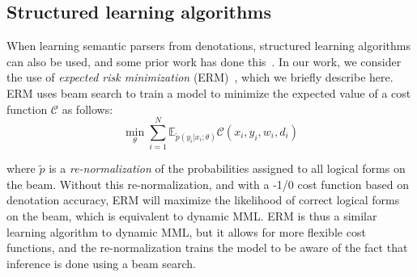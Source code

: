 \subsection{Structured learning algorithms} \label{sec:erm}

When learning semantic parsers from denotations, structured learning algorithms can also be used, and some prior work has done this~\cite{IyyerSQA2016,guu2017bridging}.  In our work, we consider the use of \emph{expected risk minimization} (ERM)~\cite{smith2006minimum}, which we briefly describe here.  ERM uses beam search to train a model to minimize the expected value of a cost function $\mathcal{C}$ as follows:
\begin{equation}
    \min_{\theta} \sum_{i=1}^{N} \mathbb{E}_{\tilde{p}(y_i|x_i; \theta)}\mathcal{C}(x_i, y_i, w_i, d_i)
    \label{eq:erm}
\end{equation}

\noindent
where $\tilde{p}$ is a \emph{re-normalization} of the probabilities assigned to all logical forms on the beam.  Without this re-normalization, and with a -1/0 cost function based on denotation accuracy, ERM will maximize the likelihood of correct logical forms on the beam, which is equivalent to dynamic MML.  ERM is thus a similar learning algorithm to dynamic MML, but it allows for more flexible cost functions, and the re-normalization trains the model to be aware of the fact that inference is done using a beam search.


